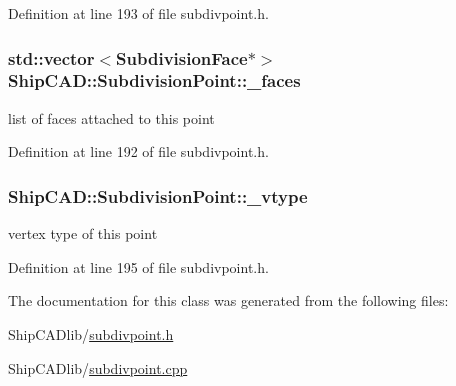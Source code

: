 Definition at line 193 of file subdivpoint.\+h.

\subsubsection[{\texorpdfstring{\+\_\+faces}{_faces}}]{\setlength{\rightskip}{0pt plus 5cm}std\+::vector$<${\bf Subdivision\+Face}$\ast$$>$ Ship\+C\+A\+D\+::\+Subdivision\+Point\+::\+\_\+faces\hspace{0.3cm}{\ttfamily [protected]}}\hypertarget{classShipCAD_1_1SubdivisionPoint_ace13688b5e2ad09c8d3f37cc0eaaaa52}{}\label{classShipCAD_1_1SubdivisionPoint_ace13688b5e2ad09c8d3f37cc0eaaaa52}
list of faces attached to this point 

Definition at line 192 of file subdivpoint.\+h.

\subsubsection[{\texorpdfstring{\+\_\+vtype}{_vtype}}]{ Ship\+C\+A\+D\+::\+Subdivision\+Point\+::\+\_\+vtype\hspace{0.3cm}{\ttfamily [protected]}}\hypertarget{classShipCAD_1_1SubdivisionPoint_a37f4626c2c18a4838f693464d93ad291}{}\label{classShipCAD_1_1SubdivisionPoint_a37f4626c2c18a4838f693464d93ad291}
vertex type of this point 

Definition at line 195 of file subdivpoint.\+h.



The documentation for this class was generated from the following files\+:\begin{DoxyCompactItemize}
\item 
Ship\+C\+A\+Dlib/\hyperlink{subdivpoint_8h}{subdivpoint.\+h}\item 
Ship\+C\+A\+Dlib/\hyperlink{subdivpoint_8cpp}{subdivpoint.\+cpp}\end{DoxyCompactItemize}

